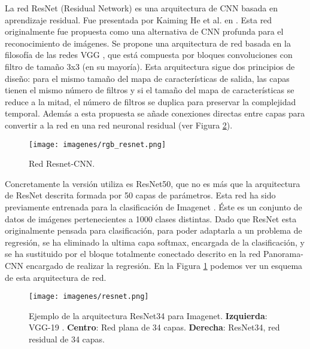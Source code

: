 La red ResNet (Residual Network) es una arquitectura de CNN basada en aprendizaje residual. Fue presentada por Kaiming He et al. en \cite{he2016deep}. Esta red originalmente fue propuesta como una alternativa de CNN profunda para el reconocimiento de imágenes. Se propone una arquitectura de red basada en la filosofía de las redes VGG \cite{simonyan2014very}, que está compuesta por bloques convoluciones con filtro de tamaño 3x3 (en su mayoría). Esta arquitectura sigue dos principios de diseño: para el mismo tamaño del mapa de características de salida, las capas tienen el mismo número de filtros y si el tamaño del mapa de características se reduce a la mitad, el número de filtros se duplica para preservar la complejidad temporal. Además a esta propuesta se añade conexiones directas entre capas para convertir a la red en una red neuronal residual (ver Figura \ref{fig:resnet}).\\

\begin{figure}[ht!]
    \centering
    \texttt{[image: imagenes/rgb\_resnet.png]}
    \caption{Red Resnet-CNN.}
    \label{fig:resnet-cnn}
\end{figure}

Concretamente la versión utiliza es ResNet50, que no es más que la arquitectura de ResNet descrita formada por 50 capas de parámetros. Esta red ha sido previamente entrenada para la clasificación de Imagenet \cite{russakovsky2015imagenet}. Éste es un conjunto de datos de imágenes pertenecientes a 1000 clases distintas. Dado que ResNet esta originalmente pensada para clasificación, para poder adaptarla a un problema de regresión, se ha eliminado la ultima capa softmax, encargada de la clasificación, y se ha sustituido por el bloque totalmente conectado descrito en la red Panorama-CNN encargado de realizar la regresión. En la Figura \ref{fig:resnet-cnn} podemos ver un esquema de esta arquitectura de red.\\

\begin{figure}[ht!]
    \centering
    \texttt{[image: imagenes/resnet.png]}
    \caption[Ejemplo de la arquitectura ResNet34 para Imagenet.]{Ejemplo de la arquitectura ResNet34 para Imagenet. \textbf{Izquierda}: VGG-19 \cite{simonyan2014very}. \textbf{Centro}: Red plana de 34 capas. \textbf{Derecha}: ResNet34, red residual de 34 capas. \cite{he2016deep}}
    \label{fig:resnet}
\end{figure}

\newpage

